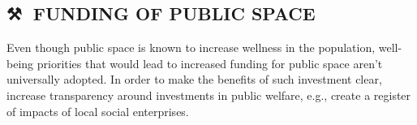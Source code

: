 \subsection*{⚒💎 FUNDING OF PUBLIC SPACE{\hfill \cognitive}}\label{pat:funding-of-public-space}

Even though public space is known to increase wellness in the
population, well-being priorities that would lead to increased funding
for public space aren’t universally adopted.  In order to make the
benefits of such investment clear, increase transparency around
investments in public welfare, e.g., create a register of impacts of
local social enterprises.
